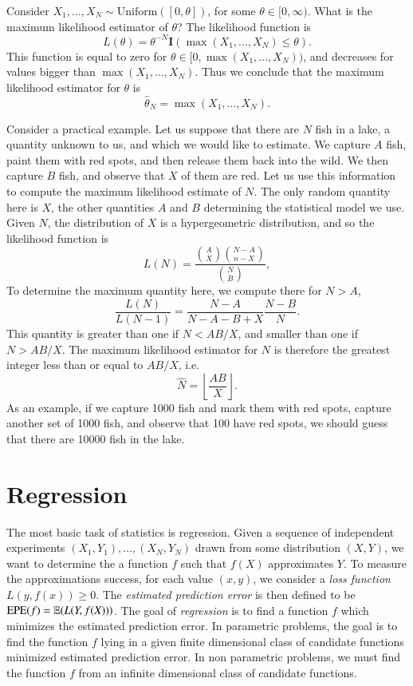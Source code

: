 \begin{example}
	Consider $X_1,\dots,X_N \sim \text{Uniform}([0,\theta])$, for some $\theta \in [0,\infty)$. What is the maximum likelihood estimator of $\theta$? The likelihood function is
	\[ L(\theta) = \theta^{-N} \mathbf{I}(\max(X_1,\dots,X_N) \leq \theta). \]
	This function is equal to zero for $\theta \in [0,\max(X_1,\dots,X_N))$, and decreases for values bigger than $\max(X_1,\dots,X_N)$. Thus we conclude that the maximum likelihood estimator for $\theta$ is
	\[ \widehat{\theta}_N = \max(X_1,\dots,X_N). \]
\end{example}

\begin{example}
	Consider a practical example. Let us suppose that there are $N$ fish in a lake, a quantity unknown to us, and which we would like to estimate. We capture $A$ fish, paint them with red spots, and then release them back into the wild. We then capture $B$ fish, and observe that $X$ of them are red. Let us use this information to compute the maximum likelihood estimate of $N$. The only random quantity here is $X$, the other quantities $A$ and $B$ determining the statistical model we use. Given $N$, the distribution of $X$ is a hypergeometric distribution, and so the likelihood function is
	\[ L(N) = \frac{{A \choose X} { N-A \choose n-X }}{{N \choose B}}, \]
	To determine the maximum quantity here, we compute there for $N > A$,
	\[ \frac{L(N)}{L(N-1)} = \frac{N-A}{N-A-B+X} \frac{N-B}{N}. \]
	This quantity is greater than one if $N < AB / X$, and smaller than one if $N > AB/X$. The maximum likelihood estimator for $N$ is therefore the greatest integer less than or equal to $AB/X$, i.e.
	\[ \widehat{N} = \left\lfloor \frac{AB}{X} \right\rfloor. \]
	As an example, if we capture 1000 fish and mark them with red spots, capture another set of 1000 fish, and observe that 100 have red spots, we should guess that there are 10000 fish in the lake.
\end{example}

\chapter{Regression}

The most basic task of statistics is regression. Given a sequence of independent experiments $(X_1, Y_1), \dots, (X_N, Y_N)$ drawn from some distribution $(X,Y)$, we want to determine the a function $f$ such that $f(X)$ approximates $Y$. To measure the approximations success, for each value $(x,y)$, we consider a \emph{loss function} $L(y,f(x)) \geq 0$. The \emph{estimated prediction error} is then defined to be $\text{EPE}(f) = \operatorname{\mathbb{E}}(L(Y,f(X)))$. The goal of \emph{regression} is to find a function $f$ which minimizes the estimated prediction error. In parametric problems, the goal is to find the function $f$ lying in a given finite dimensional class of candidate functions minimized estimated prediction error. In non parametric problems, we must find the function $f$ from an infinite dimensional class of candidate functions.

